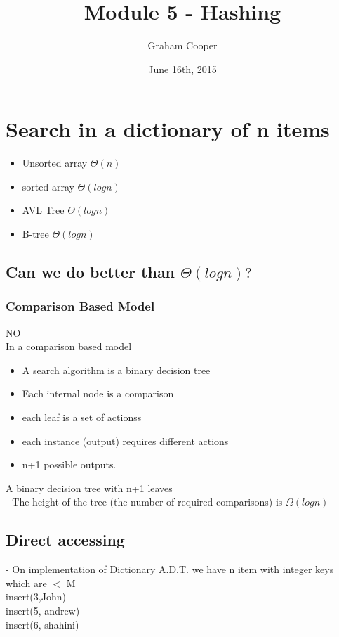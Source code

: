 \documentclass[12pt]{article}
\title{\vspace{-15ex}Module 5 - Hashing\vspace{-1ex}}
\date{June 16th, 2015}
\author{Graham Cooper}
\begin{document}
	\maketitle
	\section*{Search in a dictionary of n items}
	\begin{itemize}
		\item Unsorted array $\Theta(n)$
		\item sorted array $\Theta(logn)$
		\item AVL Tree $\Theta(logn)$
		\item B-tree $\Theta(logn)$
	\end{itemize}
	
	\subsection*{Can we do better than $\Theta(logn)?$}
	\subsubsection*{Comparison Based Model}
	NO\\
	In a comparison based model\\
	\begin{itemize}
		\item A search algorithm is a binary decision tree
		\item Each internal node is a comparison
		\item each leaf is a set of actionss
		\item each instance (output) requires different actions
		\item n+1 possible outputs.
	\end{itemize}
	
	A binary decision tree with n+1 leaves\\
	- The height of the tree (the number of required comparisons) is $\Omega(logn)$\\
	
	\subsection{Direct accessing}
	- On implementation of Dictionary A.D.T. we have n item with integer keys which are $<$ M\\
	insert(3,John)\\
	insert(5, andrew)\\
	insert(6, shahini)
	
\end{document}

